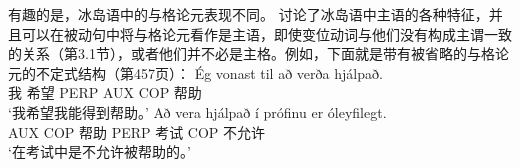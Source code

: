 \noindent
有趣的是，冰岛语中的与格论元表现不同。 \citet{ZMT85a} 讨论了冰岛语中主语的各种特征，并且可以在被动句中将与格论元看作是主语，即使变位动词与他们没有构成主谓一致的关系（第3.1节），或者他们并不必是主格。例如，下面就是带有被省略的与格论元的不定式结构（第457页）：
\eal
\ex 
\gll Ég vonast til að verða hjálpað.\\
     我 希望 PERP AUX COP 帮助\\
\glt `我希望我能得到帮助。'
\ex
\gll Að vera hjálpað í prófinu er óleyfilegt.\\
     AUX COP 帮助 PERP 考试 COP 不允许\\
\glt `在考试中是不允许被帮助的。'
\zl

